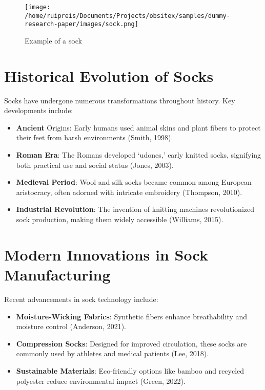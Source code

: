 \documentclass[runningheads]{llncs}
\begin{document}
\begin{figure}
\centering
\texttt{[image: /home/ruipreis/Documents/Projects/obsitex/samples/dummy-research-paper/images/sock.png]}
\caption{Example of a sock}
\label{fig:sock}
\end{figure}


\section{Historical Evolution of Socks}\label{sec:Historical_Evolution_of_Socks}



Socks have undergone numerous transformations throughout history. Key developments include:



\begin{itemize}
	\item \textbf{Ancient} Origins: Early humans used animal skins and plant fibers to protect their feet from harsh environments (Smith, 1998).
	\item \textbf{Roman Era}: The Romans developed ‘udones,’ early knitted socks, signifying both practical use and social status (Jones, 2003).
	\item \textbf{Medieval Period}: Wool and silk socks became common among European aristocracy, often adorned with intricate embroidery (Thompson, 2010).
	\item \textbf{Industrial Revolution}: The invention of knitting machines revolutionized sock production, making them widely accessible (Williams, 2015).
\end{itemize}




\section{Modern Innovations in Sock Manufacturing}\label{sec:Modern_Innovations_in_Sock_Manufacturing}



Recent advancements in sock technology include:



\begin{itemize}
	\item \textbf{Moisture-Wicking Fabrics}: Synthetic fibers enhance breathability and moisture control (Anderson, 2021).
	\item \textbf{Compression Socks}: Designed for improved circulation, these socks are commonly used by athletes and medical patients (Lee, 2018).
	\item \textbf{Sustainable Materials}: Eco-friendly options like bamboo and recycled polyester reduce environmental impact (Green, 2022).
\end{itemize}
\end{document}
